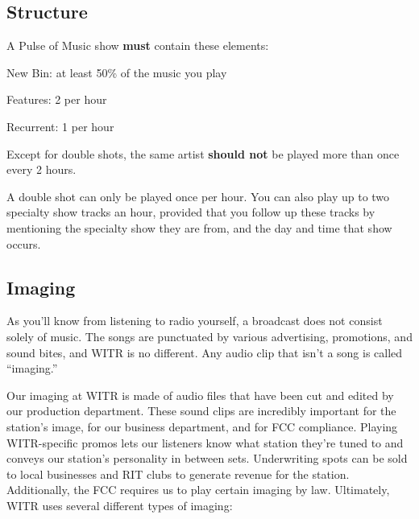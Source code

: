 \documentclass{witrman}
\begin{document}
\subsection{Structure}

A Pulse of Music show \textbf{must} contain these elements:

\begin{tightitemize}
    \item New Bin: at least 50\% of the music you play
    \item Features: 2 per hour
    \item Recurrent: 1 per hour
\end{tightitemize}

Except for double shots, the same artist \textbf{should not} be played more than
once every 2 hours.

A double shot can only be played once per hour.  You can also play up to two
specialty show tracks an hour, provided that you follow up these tracks by
mentioning the specialty show they are from, and the day and time that show
occurs.

\subsection{Imaging}

As you'll know from listening to radio yourself, a broadcast does not consist
solely of music.  The songs are punctuated by various advertising, promotions,
and sound bites, and WITR is no different.  Any audio clip that isn't a song is
called ``imaging.''

Our imaging at WITR is made of audio files that have been cut and edited by our
production department.  These sound clips are incredibly important for the
station's image, for our business department, and for FCC compliance.  Playing
WITR-specific promos lets our listeners know what station they're tuned to and
conveys our station's personality in between sets.  Underwriting spots can be
sold to local businesses and RIT clubs to generate revenue for the station.
Additionally, the FCC requires us to play certain imaging by law.  Ultimately,
WITR uses several different types of imaging:
\end{document}
